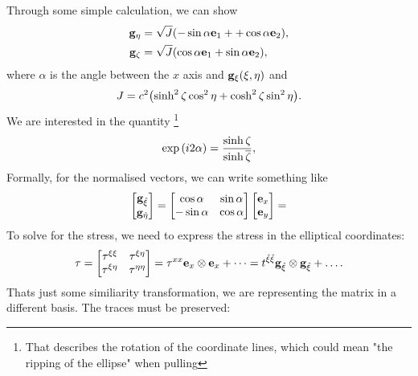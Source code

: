 \documentclass[reqno, a4paper]{article}
\begin{document}
Through some simple calculation, we can show
\begin{align*}
	\vb{g}_{\eta} &= \sqrt{J}\qty(-\sin \alpha \vb{e}_1+ + \cos \alpha\vb{e}_2), \\
	\vb{g}_{\zeta} &= \sqrt{J}\qty(\cos \alpha \vb{e}_1 + \sin \alpha \vb{e}_2),
\end{align*}
where $\alpha$ is the angle between the $x$ axis and $\vb{g}_{\xi}\qty(\xi,\eta)$ and
\[
	J = c^{2}\qty(\sinh^{2}\zeta \cos^{2}\eta + \cosh^{2}\zeta \sin^{2}\eta).
\]
We are interested in the quantity \footnote{That describes the rotation of the coordinate lines, which could mean "the ripping of the ellipse" when pulling}
\[
	\exp\qty(i 2 \alpha) = \frac{\sinh \zeta}{\sinh \overline{\zeta}},
\]
Formally, for the normalised vectors, we can write something like
\[
	\begin{bmatrix}
		\vb{g}_{\hat{\xi}} \\ \vb{g}_{\hat{\eta}} 
	\end{bmatrix}
	= \begin{bmatrix}
		\cos \alpha & \sin \alpha \\
		- \sin \alpha & \cos \alpha 
	\end{bmatrix}
	\begin{bmatrix}
		\vb{e}_x \\
		\vb{e}_y
	\end{bmatrix} =
\]
To solve for the stress, we need to express the stress in the elliptical coordinates: 
\begin{equation*}
  \mathbb{\tau} = \begin{bmatrix}
	  \tau^{\xi \xi} & \tau^{\xi \eta} \\
	  \tau^{\xi \eta} & \tau^{\eta \eta}
  \end{bmatrix} = \tau^{xx}\vb{e}_x \otimes \vb{e}_x + \dots = t^{\hat{\xi}\hat{\xi}}\vb{g}_{\hat{\xi}}\otimes \vb{g}_{\hat{\xi}} + \dots.
\end{equation*}
Thats just some similiarity transformation, we are representing the matrix in a different basis. The traces must be preserved:
\end{document}
